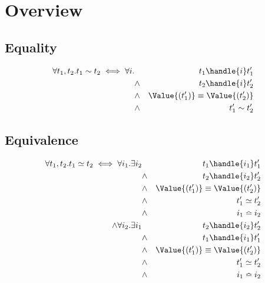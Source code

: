 
\section{Overview}

\statefultrue

\subsection{Equality}

\begin{align*}
\forall t_1, t_2 .  t_1 \sim t_2 \iff \forall i . &        & t_1 \handle{i} t_1'\\
                                                  & \wedge & t_2 \handle{i} t_2'\\
                                                  & \wedge & \Value{(t_1')} \equiv \Value{(t_2')}\\
                                                  & \wedge & t_1' \sim t_2'
\end{align*}

\subsection{Equivalence}

\begin{align*}
\forall t_1, t_2 .  t_1 \simeq t_2 \iff \forall i_1 .\exists i_2 &        & t_1 \handle{i_1} t_1'\\
                                                    & \wedge & t_2 \handle{i_2} t_2'\\
                                                    & \wedge & \Value{(t_1')} \equiv \Value{(t_2')}\\
                                                    & \wedge & t_1' \simeq t_2'\\
                                                    & \wedge & i_1 \bumpeq i_2\\
                                      \wedge\forall i_2.\exists i_1 & & t_2 \handle{i_2} t_2'\\
                                      & \wedge & t_1 \handle{i_1} t_1'\\
                                      & \wedge & \Value{(t_1')} \equiv \Value{(t_2')}\\
                                      & \wedge & t_1' \simeq t_2'\\
                                      & \wedge & i_1 \bumpeq i_2\\
\end{align*}

